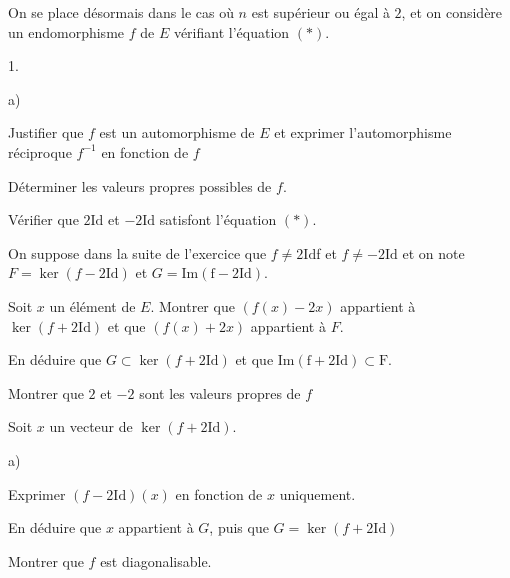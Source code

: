 \documentclass[11pt]{article}%
\begin{document}
On se place désormais dans le cas où $n$ est supérieur ou égal à $2$,
et on considère un endomorphisme $f$ de $E$ vérifiant
l'équation $\left( *\right) $.

\begin{noliste}{1.}
 \setlength{\itemsep}{4mm}
\item 
\begin{noliste}{a)}
 \setlength{\itemsep}{2mm}
\item Justifier que $f$ est un automorphisme de $E$ et exprimer
l'automorphisme réciproque $f^{-1}$ en fonction de $f$

\item Déterminer les valeurs propres possibles de $f$.

\item Vérifier que $2\mathrm{Id}$ et $-2\mathrm{Id}$ satisfont
l'équation $\left( *\right) $.
\end{noliste}

\hspace{-1cm}On suppose dans la suite de l'exercice que $f\ne
2\mathrm{Id}$f
et $f\ne -2\mathrm{Id}$ et on note $F = \ker \left(
f-2\mathrm{Id}\right) $ et 
$G = \mathrm{{Im}\left( f-2\mathrm{Id}\right).}$

\item Soit $x$ un élément de $E$. Montrer que $\left( f\left(
x\right) -2x\right) $ appartient à $\ker \left( f + 2\mathrm{Id}\right)
$
et que $\left( f\left( x\right) + 2x\right) $ appartient à $F$.

En déduire que $G\subset \ker \left( f + 2\mathrm{Id}\right) $ et que
$\mathrm{{Im}\left( f + 2\mathrm{Id}\right) \subset F}$.

Montrer que $2$ et $-2$ sont les valeurs propres de $f$

\item Soit $x$ un vecteur de $\ker \left( f + 2\mathrm{Id}\right) $.

\begin{noliste}{a)}
 \setlength{\itemsep}{2mm}
\item Exprimer $\left( f-2\mathrm{Id}\right) \left( x\right) $ en
fonction
de $x$ uniquement.

En déduire que $x$ appartient à $G$, puis que $G = \ker \left( f +
2\mathrm{Id}\right) $

\item Montrer que $f$ est diagonalisable.
\end{noliste}
\end{noliste}
\end{document}
